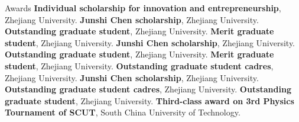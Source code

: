 \begin{rubric}{Awards}
\entry*[2022] \textbf{Individual scholarship for innovation and entrepreneurship}, Zhejiang University.
\entry*[2022] \textbf{Junshi Chen scholarship}, Zhejiang University.
\entry*[2022] \textbf{Outstanding graduate student}, Zhejiang University.
\entry*[2022] \textbf{Merit graduate student}, Zhejiang University.
\entry*[2021] \textbf{Junshi Chen scholarship}, Zhejiang University.
\entry*[2021] \textbf{Outstanding graduate student}, Zhejiang University.
\entry*[2021] \textbf{Merit graduate student}, Zhejiang University.
\entry*[2021] \textbf{Outstanding graduate student cadres}, Zhejiang University.
\entry*[2020] \textbf{Junshi Chen scholarship}, Zhejiang University.
\entry*[2020] \textbf{Outstanding graduate student cadres}, Zhejiang University.
\entry*[2019] \textbf{Outstanding graduate student}, Zhejiang University.
\entry*[2015] \textbf{Third-class award on 3rd Physics Tournament of SCUT}, South China University of Technology.
\end{rubric}